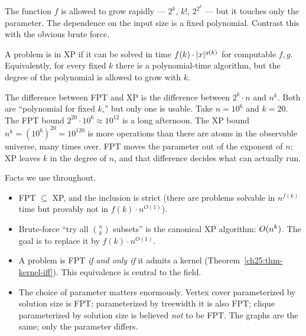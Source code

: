 The function $f$ is allowed to grow rapidly --- $2^k$, $k!$, $2^{2^k}$ --- but it touches only the parameter. The dependence on the input size is a fixed polynomial. Contrast this with the obvious brute force.

\begin{definition}\label{ch25:def-xp}
A problem is in XP if it can be solved in time $f(k)\cdot \lvert x\rvert^{g(k)}$ for computable $f,g$. Equivalently, for every fixed $k$ there is a polynomial-time algorithm, but the degree of the polynomial is allowed to grow with $k$.
\end{definition}

\begin{intuitionbox}
The difference between FPT and XP is the difference between $2^k\cdot n$ and $n^k$. Both are ``polynomial for fixed $k$,'' but only one is usable. Take $n=10^6$ and $k=20$. The FPT bound $2^{20}\cdot 10^6 \approx 10^{12}$ is a long afternoon. The XP bound $n^k = (10^6)^{20} = 10^{120}$ is more operations than there are atoms in the observable universe, many times over. FPT moves the parameter out of the exponent of $n$; XP leaves $k$ in the degree of $n$, and that difference decides what can actually run.
\end{intuitionbox}

\begin{focusbox}
Facts we use throughout.
\begin{itemize}
  \item FPT $\subseteq$ XP, and the inclusion is strict (there are problems solvable in $n^{f(k)}$ time but provably not in $f(k)\cdot n^{O(1)}$).
  \item Brute-force ``try all $\binom{n}{k}$ subsets'' is the canonical XP algorithm: $O(n^k)$. The goal is to replace it by $f(k)\cdot n^{O(1)}$.
  \item A problem is FPT \emph{if and only if} it admits a kernel (Theorem~\ref{ch25:thm-kernel-iff}). This equivalence is central to the field.
  \item The choice of parameter matters enormously. Vertex cover parameterized by solution size is FPT; parameterized by treewidth it is also FPT; clique parameterized by solution size is believed \emph{not} to be FPT. The graphs are the same; only the parameter differs.
\end{itemize}
\end{focusbox}


